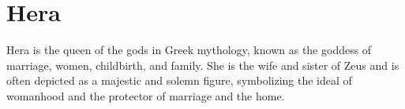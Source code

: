 \section{Hera}
Hera is the queen of the gods in Greek mythology, known as the goddess of marriage, women, childbirth, and family. She is the wife and sister of Zeus and is often depicted as a majestic and solemn figure, symbolizing the ideal of womanhood and the protector of marriage and the home.
